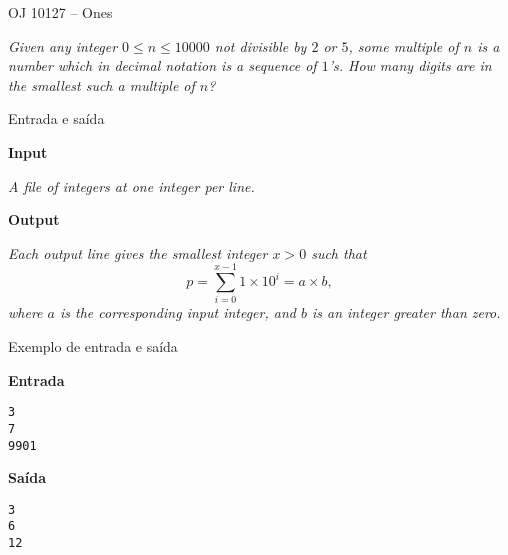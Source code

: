 \begin{frame}[fragile]{OJ 10127 -- Ones}

{\it
Given any integer $0 \leq n \leq 10000$ not divisible by $2$
or $5$, some multiple of $n$ is a number which in decimal
notation is a sequence of $1$’s. How many digits are in
the smallest such a multiple of $n$?
}

\end{frame}

\begin{frame}[fragile]{Entrada e saída}

\textbf{Input}

{\it A file of integers at one integer per line.}

\vspace{0.3in}


\textbf{Output}

{\it Each output line gives the smallest integer $x > 0$ such that $$p = \sum_{i = 0}^{x-1} 1 \times 10^i = a \times b,$$
where $a$ is the corresponding input integer, and $b$ is an integer greater than zero.}

\end{frame}

\begin{frame}[fragile]{Exemplo de entrada e saída}

\begin{minipage}[t]{0.45\textwidth}
\textbf{Entrada}
\begin{verbatim}
3
7
9901
\end{verbatim}
\end{minipage}
\begin{minipage}[t]{0.5\textwidth}
\textbf{Saída}
\begin{verbatim}
3
6
12
\end{verbatim}
\end{minipage}

\end{frame}



